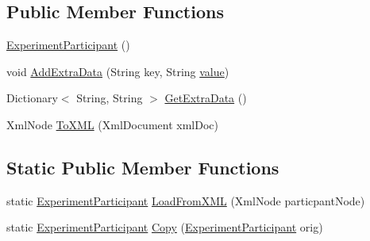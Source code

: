 \subsection*{Public Member Functions}
\begin{DoxyCompactItemize}
\item 
\hyperlink{class_web_analyzer_1_1_models_1_1_base_1_1_experiment_participant_a632bcef21dbfec67a257b0eabeed20af}{Experiment\+Participant} ()
\item 
void \hyperlink{class_web_analyzer_1_1_models_1_1_base_1_1_experiment_participant_a6592d4e6f7130c1c9ddd4e5c4ef81492}{Add\+Extra\+Data} (String key, String \hyperlink{_u_i_2_h_t_m_l_resources_2js_2lib_2underscore_8min_8js_af7e1471ab89699458c4df8bb657298f6}{value})
\item 
Dictionary$<$ String, String $>$ \hyperlink{class_web_analyzer_1_1_models_1_1_base_1_1_experiment_participant_a2dfb5382114513277243f8833f77b6a7}{Get\+Extra\+Data} ()
\item 
Xml\+Node \hyperlink{class_web_analyzer_1_1_models_1_1_base_1_1_experiment_participant_a6463c49ad51859c56a396bab4137a012}{To\+X\+M\+L} (Xml\+Document xml\+Doc)
\end{DoxyCompactItemize}
\subsection*{Static Public Member Functions}
\begin{DoxyCompactItemize}
\item 
static \hyperlink{class_web_analyzer_1_1_models_1_1_base_1_1_experiment_participant}{Experiment\+Participant} \hyperlink{class_web_analyzer_1_1_models_1_1_base_1_1_experiment_participant_a404923c7d18b8d4f89bac4d28fdb832a}{Load\+From\+X\+M\+L} (Xml\+Node particpant\+Node)
\item 
static \hyperlink{class_web_analyzer_1_1_models_1_1_base_1_1_experiment_participant}{Experiment\+Participant} \hyperlink{class_web_analyzer_1_1_models_1_1_base_1_1_experiment_participant_a519f759041e5db2488b821d2879d3199}{Copy} (\hyperlink{class_web_analyzer_1_1_models_1_1_base_1_1_experiment_participant}{Experiment\+Participant} orig)
\end{DoxyCompactItemize}

